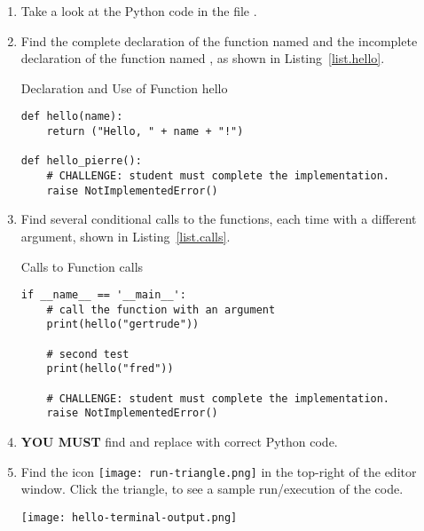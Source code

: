 \begin{enumerate}
\item Take a look at the Python code in the file . 

\item Find the complete declaration of the function named  and
  the incomplete declaration of the function named , as shown in Listing~\ref{list.hello}.

\begin{listing}{Declaration and Use of Function }{hello}
\begin{minipage}[c]{0.95\textwidth}\begin{lstlisting}
def hello(name):
    return ("Hello, " + name + "!")

def hello_pierre():
    # CHALLENGE: student must complete the implementation.
    raise NotImplementedError()
\end{lstlisting}\end{minipage}\end{listing}

\item Find several conditional calls to the functions, each time
  with a different argument, shown in Listing~\ref{list.calls}.


\begin{listing}{Calls to Function }{calls}
\begin{minipage}[c]{0.95\textwidth}\begin{lstlisting}
if __name__ == '__main__':
    # call the function with an argument
    print(hello("gertrude"))
    
    # second test
    print(hello("fred"))

    # CHALLENGE: student must complete the implementation.
    raise NotImplementedError()
\end{lstlisting}\end{minipage}\end{listing}


\item  \textbf{YOU MUST} find and replace  with correct Python code.

\item Find the icon \texttt{[image: run-triangle.png]} in the
top-right of the editor window.  Click the triangle, to see a sample
run/execution of the code.

\noindent\texttt{[image: hello-terminal-output.png]}

\end{enumerate}

